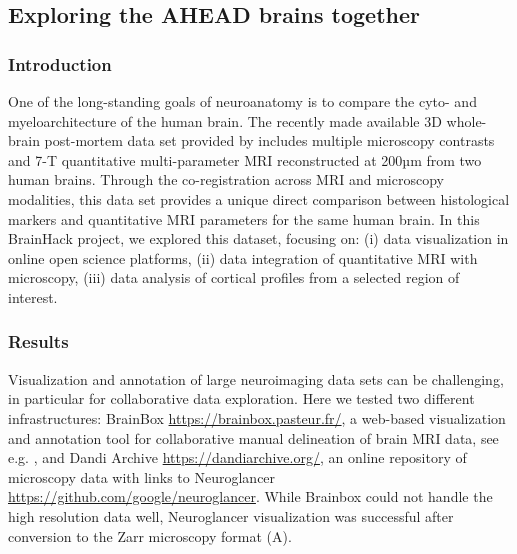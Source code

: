 \documentclass[../main.tex]{subfiles}
\begin{document}
\subsection{Exploring the AHEAD brains together}

%

\subsubsection{Introduction}
One of the long-standing goals of neuroanatomy is to compare the cyto- and myeloarchitecture of the human brain. The recently made available 3D whole-brain post-mortem data set provided by \textcite{Alkemade2022} includes multiple microscopy contrasts and 7-T quantitative multi-parameter MRI reconstructed at 200µm from two human brains. Through the co-registration across MRI and microscopy modalities, this data set provides a unique direct comparison between histological markers and quantitative MRI parameters for the same human brain. In this BrainHack project, we explored this dataset, focusing on: (i) data visualization in online open science platforms, (ii) data integration of quantitative MRI with microscopy, (iii) data analysis of cortical profiles from a selected region of interest. 


\subsubsection{Results}

Visualization and annotation of large neuroimaging data sets can be challenging, in particular for collaborative data exploration. Here we tested two different infrastructures: BrainBox \url{https://brainbox.pasteur.fr/}, a web-based visualization and annotation tool for collaborative manual delineation of brain MRI data, see e.g. \parencite{heuer_evolution_2019}, and Dandi Archive \url{https://dandiarchive.org/}, an online repository of microscopy data with links to Neuroglancer \url{https://github.com/google/neuroglancer}. While Brainbox could not handle the high resolution data well, Neuroglancer visualization was successful after conversion to the Zarr microscopy format (A).
\end{document}
